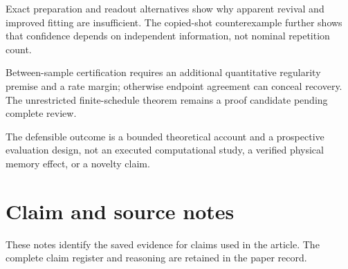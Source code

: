 \documentclass[11pt]{article}
\begin{document}
Exact preparation and readout alternatives show why apparent revival and improved fitting are insufficient. The copied-shot counterexample further shows that confidence depends on independent information, not nominal repetition count.

Between-sample certification requires an additional quantitative regularity premise and a rate margin; otherwise endpoint agreement can conceal recovery. The unrestricted finite-schedule theorem remains a proof candidate pending complete review.

The defensible outcome is a bounded theoretical account and a prospective evaluation design, not an executed computational study, a verified physical memory effect, or a novelty claim.

\appendix
\section{Claim and source notes}
These notes identify the saved evidence for claims used in the article. The complete claim register and reasoning are retained in the paper record.
\end{document}

